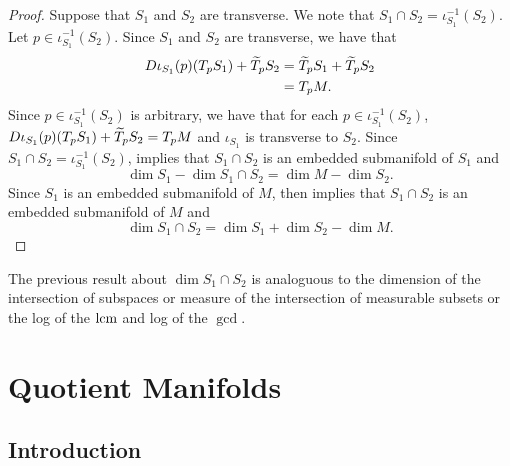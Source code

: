 \documentclass{book}
\begin{document}
	\begin{proof}
		Suppose that $S_1$ and $S_2$ are transverse. We note that $S_1 \cap S_2 = \iota_{S_1}^{-1}(S_2)$. Let $p \in \iota_{S_1}^{-1}(S_2)$. Since $S_1$ and $S_2$ are transverse, we have that
		\begin{align*}
			D\iota_{S_1}(p)(T_p S_1) + \widetilde{T}_pS_2
			& = \widetilde{T}_p S_1 + \widetilde{T}_p S_2 \\
			& = T_pM.
		\end{align*} 
		Since $p \in \iota_{S_1}^{-1}(S_2)$ is arbitrary, we have that for each $p \in \iota_{S_1}^{-1}(S_2)$, $D\iota_{S_1}(p)(T_p S_1) + \widetilde{T}_pS_2 = T_pM$ and $\iota_{S_1}$ is transverse to $S_2$. Since $S_1 \cap S_2 = \iota_{S_1}^{-1}(S_2)$,  implies that $S_1 \cap S_2$ is an embedded submanifold of $S_1$ and 
		$$\dim S_1 - \dim S_1 \cap S_2 = \dim M - \dim S_2.$$ 
		Since $S_1$ is an embedded submanifold of $M$,   then implies that $S_1 \cap S_2$ is an embedded submanifold of $M$ and 
		$$\dim S_1 \cap S_2 = \dim S_1 + \dim S_2 - \dim M.$$
	\end{proof}

	\begin{note}
		The previous result about $\dim S_1 \cap S_2$ is analoguous to the dimension of the intersection of subspaces or measure of the intersection of measurable subsets or the log of the $\text{lcm}$ and log of the $\gcd$.
	\end{note}
	
	
	
	
	
	
	
	
	
	
	
	
	
	
	
	
	
	
	
	
	
	
	
	
	
	
	
	
	
	
	
	
	
	
	\newpage
	\chapter{Quotient Manifolds}
	
	\section{Introduction}
	
\end{document}
